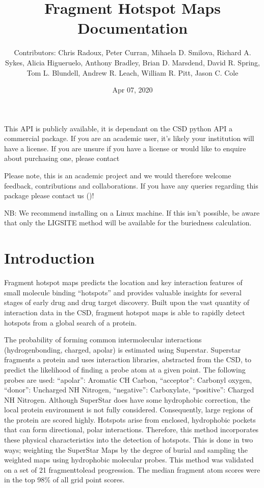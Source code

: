 \documentclass[letterpaper,10pt,english]{sphinxmanual}
\title{Fragment Hotspot Maps Documentation}
\date{Apr 07, 2020}
\author{Contributors: Chris Radoux, Peter Curran, Mihaela D. Smilova, Richard A. Sykes, Alicia Higueruelo, Anthony Bradley, Brian D. Marsdend, David R. Spring, Tom L. Blundell, Andrew R. Leach, William R. Pitt, Jason C. Cole}
\begin{document}
\pagestyle{empty}
\sphinxmaketitle
\pagestyle{plain}
\sphinxtableofcontents
\pagestyle{normal}
\label{\detokenize{index::doc}}


\noindent{}

This API is publicly available, it is dependant on the CSD python API \sphinxhyphen{} a commercial package.
If you are an academic user, it’s likely your institution will have a license. If you are unsure if you have a
license or would like to enquire about purchasing one, please contact 

Please note, this is an academic project and we would therefore welcome feedback, contributions and collaborations.
If you have any queries regarding this package please contact us ()!

NB: We recommend installing on a Linux machine. If this isn’t possible, be aware that only the LIGSITE method will be
available for the buriedness calculation.


\chapter{Introduction}
\label{\detokenize{tutorial:introduction}}\label{\detokenize{tutorial::doc}}
Fragment hotspot maps predicts the location and key interaction features of small molecule binding “hotspots” and
provides valuable insights for several stages of early drug and drug target discovery. Built upon the vast quantity of
interaction data in the CSD, fragment hotspot maps is able to rapidly detect hotspots from a global search of a
protein.

The probability of forming common intermolecular interactions (hydrogen\sphinxhyphen{}bonding, charged, apolar) is estimated using
Superstar. Superstar fragments a protein and uses interaction libraries, abstracted from the CSD, to predict the
likelihood of finding a probe atom at a given point. The following probes are used: “apolar”: Aromatic CH Carbon,
“acceptor”: Carbonyl oxygen, “donor”: Uncharged NH Nitrogen, “negative”: Carboxylate, “positive”: Charged NH Nitrogen.
Although SuperStar does have some hydrophobic correction, the local protein environment is not fully considered.
Consequently, large regions of the protein are scored highly. Hotspots arise from enclosed,
hydrophobic pockets that can form directional, polar interactions. Therefore, this method incorporates these physical
characteristics into the detection of hotspots. This is done in two ways; weighting the SuperStar Maps by the degree of
burial and sampling the weighted maps using hydrophobic molecular probes. This method was validated on a set of 21
fragment\sphinxhyphen{}to\sphinxhyphen{}lead progression. The median fragment atom scores were in the top 98\% of all grid point scores.
\end{document}
